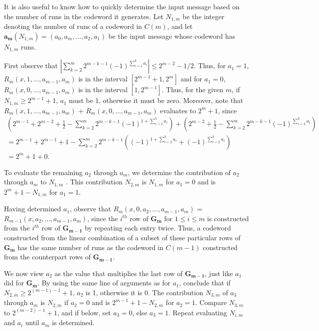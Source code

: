 \documentclass[12pt]{article} \pagestyle{plain} \topmargin
\begin{document}
It is also useful to know how to quickly determine the input message
based on the number of runs in the codeword it generates. Let
$N_{1,m}$ be the integer denoting the number of runs of a codeword
in $C(m)$, and let $\mathbf{a_m}(N_{1,m})=(a_0,a_m,...,a_{2},a_1)$
be the input message whose codeword has $N_{1,m}$ runs.%

First observe that $|\sum_{k=2}^m
2^{m-k-1}(-1)^{\sum_{i=1}^ka_i}|\leq 2^{m-2}-1/2$. Thus, for
$a_1=1$, $R_m(x,1,...,a_{m-1},a_m)$ is in the interval $[2^{m-1}+1,
2^m]$ and for $a_1=0$, $R_m(x,0,...,a_{m-1},a_m)$ is in the interval
$[1,2^{m-1}]$. Thus, for the given $m$, if $N_{1,m} \geq 2^{m-1}+1$,
$a_1$ must be 1, otherwise it must be zero. Moreover, note that
$R_m(x,1,...,a_{m-1},a_m)$ + $R_m(x,0,...,a_{m-1},a_m)$ evaluates to
$2^m+1$, since
\begin{equation*}\begin{array}{lll}
\left(2^{m-1}+2^{m-2}+\frac{1}{2}-\sum_{k=2}^m2^{m-k-1}(-1)^{1+\sum_{i=2}^k
a_i}\right)+\left(2^{m-2}+\frac{1}{2}-\sum_{k=2}^m2^{m-k-1}(-1)^{\sum_{i=2}^k
a_i}\right)\\= 2^{m-1}+2^{m-1}+1-\sum_{k=2}^m2^{m-k-1}
\left((-1)^{1+\sum_{i=2}^k a_i}+ (-1)^{\sum_{i=2}^k a_i}\right)\\
=2^m+1+0.
\end{array}\end{equation*}

To evaluate the remaining $a_2$ through $a_m$, we determine the
contribution of $a_2$ through $a_m$ to $N_{1,m}$ . This contribution
$N_{2,m}$ is $N_{1,m}$ for $a_1=0$ and is $2^{m}+1-N_{1,m}$ for
$a_1=1$.

Having determined $a_1$, observe that $R_m(x,0,a_2,...,a_{m-1},a_m)$
= $R_{m-1}(x,a_2,...,a_{m-1},a_m)$, since the $i^{th}$ row of
$\mathbf{G_m}$ for $1 \leq i \leq m$ is constructed from the
$i^{th}$ row of $\mathbf{G_{m-1}}$ by repeating each entry twice.
Thus, a codeword constructed from the linear combination of a subset
of these particular rows of $\mathbf{G_m}$ has the same number of
runs as the codeword in $C(m-1)$ constructed from the counterpart
rows of $\mathbf{G_{m-1}}$.

We now view $a_2$ as the value that multiplies the last row of
$\mathbf{G_{m-1}}$, just like $a_1$ did for $\mathbf{G_{m}}$. By
using the same line of arguments as for $a_1$, conclude that if
$N_{2,m} \geq 2^{(m-1)-1}+1$, $a_2$ is 1, otherwise it is 0. The
contribution $N_{3,m}$ of $a_3$ through $a_m$ is $N_{2,m}$ if
$a_2=0$ and is $2^{m-1}+1-N_{2,m}$ for $a_2=1$. Compare $N_{3,m}$ to
$2^{(m-2)-1}+1$, and if below, set $a_3=0$, else $a_3=1$. Repeat
evaluating $N_{i,m}$ and $a_i$ until $a_m$ is determined.
\end{document}
